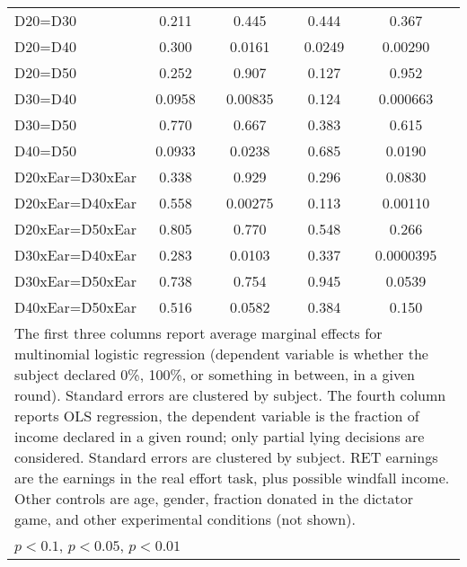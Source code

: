 \begin{tabular}{l|cccccc|cc}
D20=D30         &    0.211         &         &    0.445         &         &    0.444         &         &    0.367         &         \\
D20=D40         &    0.300         &         &   0.0161         &         &   0.0249         &         &  0.00290         &         \\
D20=D50         &    0.252         &         &    0.907         &         &    0.127         &         &    0.952         &         \\
D30=D40         &   0.0958         &         &  0.00835         &         &    0.124         &         & 0.000663         &         \\
D30=D50         &    0.770         &         &    0.667         &         &    0.383         &         &    0.615         &         \\
D40=D50         &   0.0933         &         &   0.0238         &         &    0.685         &         &   0.0190         &         \\
D20xEar=D30xEar &    0.338         &         &    0.929         &         &    0.296         &         &   0.0830         &         \\
D20xEar=D40xEar &    0.558         &         &  0.00275         &         &    0.113         &         &  0.00110         &         \\
D20xEar=D50xEar &    0.805         &         &    0.770         &         &    0.548         &         &    0.266         &         \\
D30xEar=D40xEar &    0.283         &         &   0.0103         &         &    0.337         &         &0.0000395         &         \\
D30xEar=D50xEar &    0.738         &         &    0.754         &         &    0.945         &         &   0.0539         &         \\
D40xEar=D50xEar &    0.516         &         &   0.0582         &         &    0.384         &         &    0.150         &         \\
\hline\hline
\multicolumn{9}{p{16cm}}{\tiny The first three columns report average marginal effects for multinomial logistic regression (dependent variable is whether the subject declared 0\%, 100\%, or something in between, in a given round). Standard errors are clustered by subject. The fourth column reports OLS regression, the dependent variable is the fraction of income declared in a given round; only partial lying decisions are considered. Standard errors are clustered by subject. RET earnings are the earnings in the real effort task, plus possible windfall income. Other controls are age, gender, fraction donated in the dictator game, and other experimental conditions (not shown). }\\
\multicolumn{9}{l}{\tiny \sym{*} \(p<0.1\), \sym{**} \(p<0.05\), \sym{***} \(p<0.01\)}\\
\end{tabular}